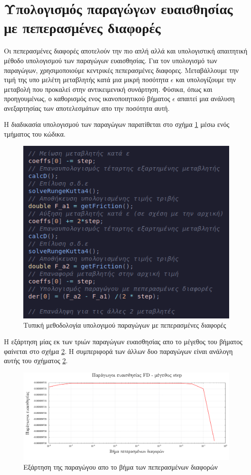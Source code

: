 \section{Υπολογισμός παραγώγων ευαισθησίας με πεπερασμένες διαφορές}

Οι πεπερασμένες διαφορές αποτελούν την πιο απλή αλλά και υπολογιστική απαιτητική μέθοδο υπολογισμού των παραγώγων ευαισθησίας. Για τον υπολογισμό των παραγώγων, χρησιμοποιούμε κεντρικές πεπερασμένες διαφορες. Μεταβάλλουμε την τιμή της υπο μελέτη μεταβλητής κατά μια μικρή ποσότητα $\epsilon$ και υπολογίζουμε την μεταβολή που προκαλεί στην αντικειμενική συνάρτηση. Φύσικα, όπως και προηγουμένως, ο καθορισμός ενος ικανοποιητικού βήματος $\epsilon$ απαιτεί μια ανάλυση ανεξαρτησίας των αποτελεσμάτων απο την ποσότητα αυτή.



Η διαδικασία υπολογισμού των παραγώγων παρατίθεται στο σχήμα \ref{fig:fdcode} μέσω ενός τμήματος του κώδικα.
%

\begin{figure}[h!]
\centering
\includegraphics[height=.5\textwidth]{figures/FD_code.png}
\caption{Τυπική μεθοδολογία υπολογιμού παραγώγων με πεπερασμένες διαφορές}
\label{fig:fdcode}
\end{figure}

Η εξάρτηση μίας εκ των τριών παραγώγων ευαισθησίας απο το μέγεθος του βήματος φαίνεται στο σχήμα \ref{fig:fdstep}. Η συμπεριφορά των άλλων δυο παραγώγων είναι ανάλογη αυτής του σχήματος \ref{fig:fdstep}.


\begin{figure}[h!]
\centering
\includegraphics[width=.8\textwidth]{figures/fd_step.pdf}
\caption{Εξάρτηση της παραγώγου απο το βήμα των πεπερασμένων διαφορών}
\label{fig:fdstep}
\end{figure}

